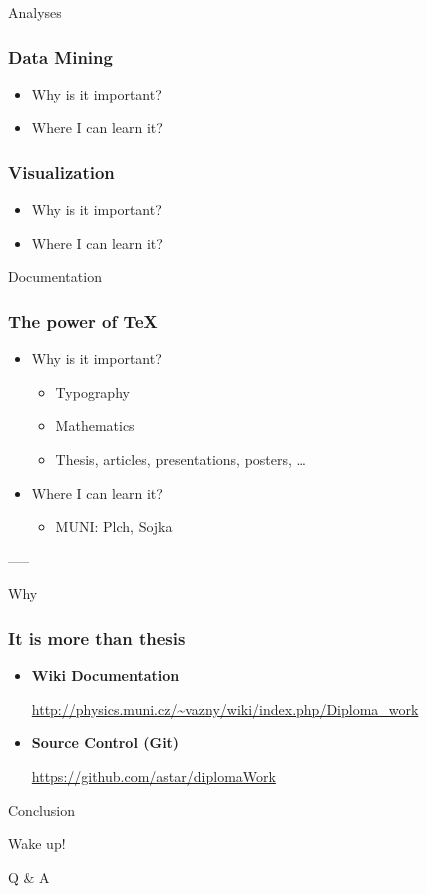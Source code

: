 \documentclass[fleqn]{beamer}
\begin{document}
\begin{section}{Analyses}
  \begin{frame}\frametitle{Data Mining}
  \begin{itemize}
    \item{Why is it important?}
    \item{Where I can learn it?}
  \end{itemize}
  \end{frame}

  \begin{frame}\frametitle{Visualization}
  \begin{itemize}
    \item{Why is it important?}
    \item{Where I can learn it?}
  \end{itemize}

  \end{frame}
\end{section}


\begin{section}{Documentation}
  \begin{frame}\frametitle{The power of \TeX}
  \begin{itemize}
    \item{Why is it important?}
      \begin{itemize}
      \item Typography
      \item Mathematics
      \item Thesis, articles, presentations, posters, \ldots
      \end{itemize}
    \item{Where I can learn it?}
      \begin{itemize}
      \item MUNI: Plch, Sojka
      \end{itemize}
  \end{itemize}

\end{frame}

\end{section}
-----


\begin{section}{Why}

\begin{frame}\frametitle{It is more than thesis}
  \begin{itemize}
  \item \textbf{Wiki Documentation}

    \url{http://physics.muni.cz/~vazny/wiki/index.php/Diploma_work}
  \item \textbf{Source Control (Git)}

    \url{https://github.com/astar/diplomaWork}

  \end{itemize}
\end{frame}
\end{section}


\begin{section}{Conclusion}
\begin{frame}
  \begin{center}
 \huge{Wake up!}

 \bigskip

 \huge Q \& A    
  \end{center}
\end{frame}
\end{section}
\end{document}
